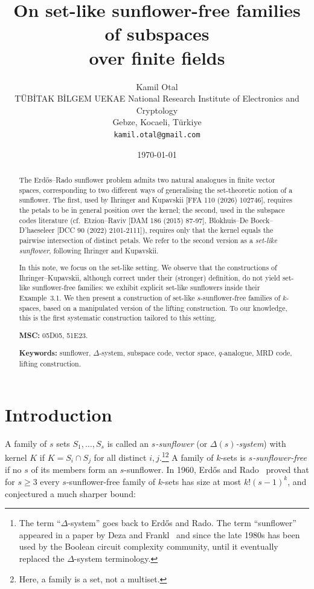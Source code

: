 \documentclass[11pt]{article}
\title{On set-like sunflower-free families of subspaces\\over finite fields}
\author{Kamil Otal\\
  \small T\"UB\.ITAK B\.ILGEM UEKAE National Research Institute of Electronics and Cryptology\\
  \small Gebze, Kocaeli, T\"urkiye\\
  \small \texttt{kamil.otal@gmail.com}}
\date{\today}
\theoremstyle{definition}
\begin{document}
\maketitle

\begin{abstract}
The Erd\H{o}s--Rado sunflower problem admits two natural analogues in finite vector spaces, corresponding to two different ways of generalising the set-theoretic notion of a sunflower. The first, used by Ihringer and Kupavskii [FFA 110 (2026) 102746], requires the petals to be in general position over the kernel; the second, used in the subspace codes literature (cf.\ Etzion--Raviv [DAM 186 (2015) 87-97], Blokhuis--De Boeck--D'haeseleer [DCC 90 (2022) 2101-2111]), requires only that the kernel equals the pairwise intersection of distinct petals. We refer to the second version as a \emph{set-like sunflower}, following Ihringer and Kupavskii.

In this note, we focus on the set-like setting. We observe that the constructions of Ihringer--Kupavskii, although correct under their (stronger) definition, do not yield set-like sunflower-free families: we exhibit explicit set-like sunflowers inside their Example~3.1. We then present a construction of set-like $s$-sunflower-free families of $k$-spaces, based on a manipulated version of the lifting construction. To our knowledge, this is the first systematic construction tailored to this setting.

\medskip
\noindent\textbf{MSC:} 05D05, 51E23.

\noindent\textbf{Keywords:} sunflower, $\Delta$-system, subspace code, vector space, $q$-analogue, MRD code, lifting construction.
\end{abstract}

\section{Introduction}

A family of $s$ sets $S_1, \ldots, S_s$ is called an \emph{$s$-sunflower} (or \emph{$\Delta(s)$-system}) with kernel $K$ if $K = S_i \cap S_j$ for all distinct $i, j$.\footnote{The term ``$\Delta$-system'' goes back to Erd\H{o}s and Rado. The term ``sunflower'' appeared in a paper by Deza and Frankl~\cite{deza-frankl} and since the late 1980s has been used by the Boolean circuit complexity community, until it eventually replaced the $\Delta$-system terminology.}\footnote{Here, a family is a set, not a multiset.} A family of $k$-sets is \emph{$s$-sunflower-free} if no $s$ of its members form an $s$-sunflower. In 1960, Erd\H{o}s and Rado~\cite{erdos-rado} proved that for $s \geq 3$ every $s$-sunflower-free family of $k$-sets has size at most $k!(s-1)^k$, and conjectured a much sharper bound:
\end{document}
